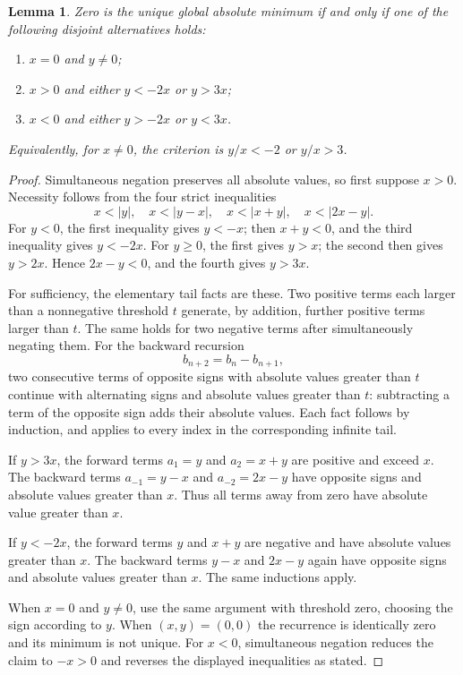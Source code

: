 \documentclass[11pt]{article}
\newtheorem{lemma}[theorem]{Lemma}
\newcommand{\abs}[1]{\lvert#1\rvert}
\begin{document}
\begin{lemma}\label{lem:cone}
Zero is the unique global absolute minimum if and only if one of the following disjoint alternatives holds:
\begin{enumerate}
\item $x=0$ and $y\ne0$;
\item $x>0$ and either $y<-2x$ or $y>3x$;
\item $x<0$ and either $y>-2x$ or $y<3x$.
\end{enumerate}
Equivalently, for $x\ne0$, the criterion is $y/x<-2$ or $y/x>3$.
\end{lemma}
\begin{proof}
Simultaneous negation preserves all absolute values, so first suppose $x>0$. Necessity follows from the four strict inequalities
\[
 x<\abs y,\quad x<\abs{y-x},\quad
 x<\abs{x+y},\quad x<\abs{2x-y}.
\]
For $y<0$, the first inequality gives $y<-x$; then $x+y<0$, and the third inequality gives $y<-2x$. For $y\ge0$, the first gives $y>x$; the second then gives $y>2x$. Hence $2x-y<0$, and the fourth gives $y>3x$.

For sufficiency, the elementary tail facts are these. Two positive terms each larger than a nonnegative threshold $t$ generate, by addition, further positive terms larger than $t$. The same holds for two negative terms after simultaneously negating them. For the backward recursion
\[
 b_{n+2}=b_n-b_{n+1},
\]
two consecutive terms of opposite signs with absolute values greater than $t$ continue with alternating signs and absolute values greater than $t$: subtracting a term of the opposite sign adds their absolute values. Each fact follows by induction, and applies to every index in the corresponding infinite tail.

If $y>3x$, the forward terms $a_1=y$ and $a_2=x+y$ are positive and exceed $x$. The backward terms $a_{-1}=y-x$ and $a_{-2}=2x-y$ have opposite signs and absolute values greater than $x$. Thus all terms away from zero have absolute value greater than $x$.

If $y<-2x$, the forward terms $y$ and $x+y$ are negative and have absolute values greater than $x$. The backward terms $y-x$ and $2x-y$ again have opposite signs and absolute values greater than $x$. The same inductions apply.

When $x=0$ and $y\ne0$, use the same argument with threshold zero, choosing the sign according to $y$. When $(x,y)=(0,0)$ the recurrence is identically zero and its minimum is not unique. For $x<0$, simultaneous negation reduces the claim to $-x>0$ and reverses the displayed inequalities as stated.
\end{proof}
\end{document}
